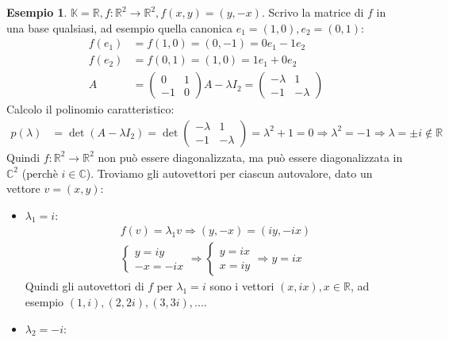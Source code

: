 \documentclass[a4paper]{article}
\theoremstyle{definition}
\newtheorem*{es}{Esempio}
\begin{document}
	\begin{es}
		$\mathbb{K} = \mathbb{R}, f: \mathbb{R}^2 \to \mathbb{R}^2, f(x, y) = (y, -x)$.
		Scrivo la matrice di $f$ in una base qualsiasi, ad esempio quella canonica $e_1 = (1, 0), e_2 = (0, 1)$:
		\begin{align*}
			f(e_1) &= f(1, 0) = (0, -1) = 0e_1 - 1e_2 \\
			f(e_2) &= f(0, 1) = (1, 0) = 1e_1 + 0e_2 \\
			A &= \begin{pmatrix}
				0 & 1 \\
				-1 & 0
			\end{pmatrix}
			A - \lambda I_2 = \begin{pmatrix}
				- \lambda & 1 \\
				-1 & - \lambda
			\end{pmatrix}
		\end{align*}
		Calcolo il polinomio caratteristico:
		\begin{align*}
			p(\lambda) &= \det(A - \lambda I_2) = \det \begin{pmatrix}
				- \lambda & 1 \\
				-1 & - \lambda
			\end{pmatrix} = \lambda^2 + 1 = 0 \Rightarrow \lambda^2 = -1 \Rightarrow \lambda = \pm i \notin \mathbb{R}
		\end{align*}
		Quindi $f: \mathbb{R}^2 \to \mathbb{R}^2$ non può essere diagonalizzata, ma può essere diagonalizzata in $\mathbb{C}^2$ (perchè $i \in \mathbb{C}$).
		Troviamo gli autovettori per ciascun autovalore, dato un vettore $v = (x, y)$:
		\begin{itemize}
			\item $\lambda_1 = i$:
				\begin{align*}
					f(v) = \lambda_1 v \Rightarrow (y, -x) = (iy, -ix) \\
					\begin{cases}
						y = iy \\
						- x = - ix
					\end{cases} \Rightarrow \begin{cases}
						y = ix \\
						x = iy
					\end{cases} \Rightarrow y = ix
				\end{align*}
				Quindi gli autovettori di $f$ per $\lambda_1 = i$ sono i vettori $(x, ix), x \in \mathbb{R}$, ad esempio $(1, i), (2, 2i), (3, 3i), ...$.
			\item $\lambda_2 = -i$: 
				\begin{align*}

\end{align*}
\end{itemize}
\end{es}
\end{document}
